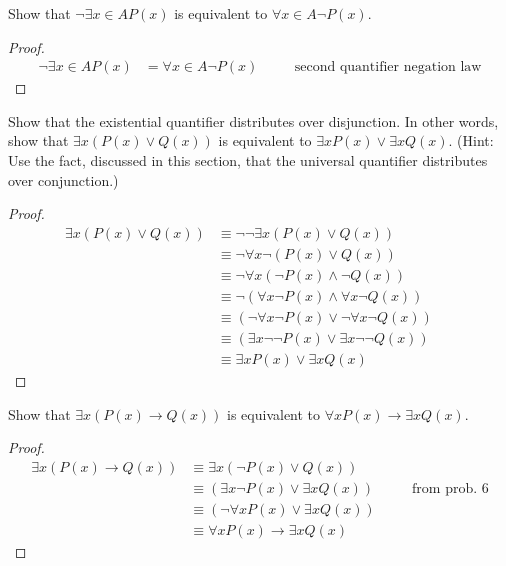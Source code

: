 \begin{tcolorbox}[title=Problem 5, breakable]   
    Show that $\neg \exists{x} \in A P(x)$ is equivalent to $\forall{x} \in A \neg P(x)$.
\end{tcolorbox}

\begin{proof}
    \begin{align*}
        \neg \exists{x} \in A P(x) &= \forall{x} \in A \neg P(x) && \quad \text{second quantifier negation law}
    \end{align*}
\end{proof}

\begin{tcolorbox}[title=Problem 6, breakable]
    Show that the existential quantifier distributes over disjunction. In other words, 
    show that $\exists{x}(P(x) \vee Q(x))$ is equivalent to 
    $\exists{x}P(x) \vee \exists{x}Q(x)$. (Hint: Use the fact, discussed in this section, that 
    the universal quantifier distributes over conjunction.)
\end{tcolorbox}

\begin{proof}
    \begin{align*}
        \exists{x}(P(x) \vee Q(x)) &\equiv \neg\neg \exists{x}(P(x) \vee Q(x)) && \\
        &\equiv \neg \forall{x}\neg(P(x) \vee Q(x)) && \\
        &\equiv \neg \forall{x}(\neg P(x) \wedge \neg Q(x)) && \\
        &\equiv \neg (\forall{x}\neg P(x) \wedge \forall{x}\neg Q(x)) && \\
        &\equiv (\neg \forall{x}\neg P(x) \vee \neg \forall{x}\neg Q(x)) && \\
        &\equiv (\exists{x}\neg\neg P(x) \vee \exists{x}\neg\neg Q(x)) && \\
        &\equiv \exists{x} P(x) \vee \exists{x} Q(x)
    \end{align*}
\end{proof}

\begin{tcolorbox}[title=Problem 7, breakable]
    Show that $\exists{x}(P(x) \rightarrow Q(x))$ is equivalent to 
    $\forall{x}P(x) \rightarrow \exists{x}Q(x)$.
\end{tcolorbox}

\begin{proof}
    \begin{align*}
        \exists{x}(P(x) \rightarrow Q(x)) &\equiv \exists{x}(\neg P(x) \vee Q(x)) && \\
        &\equiv (\exists{x}\neg P(x) \vee \exists{x}Q(x)) && \quad \text{from prob. $6$} \\
        &\equiv (\neg \forall{x} P(x) \vee \exists{x}Q(x)) && \\
        &\equiv \forall{x} P(x) \rightarrow \exists{x}Q(x)
    \end{align*}
\end{proof}


